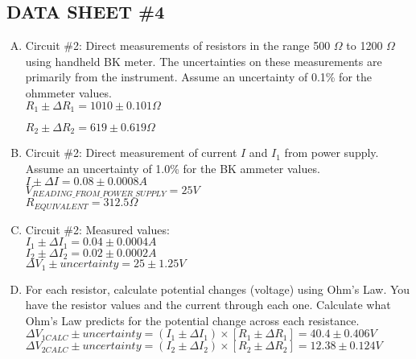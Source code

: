 \subsection{DATA SHEET \#4}
	\begin{enumerate}[A.]
		\item Circuit \#2: Direct measurements of resistors in the range 500 $\Omega$ to 1200 $\Omega$ using handheld BK meter.  The uncertainties on these measurements are primarily from the instrument.  Assume an uncertainty of 0.1\% for the ohmmeter values. \\
		
			$R_1 \pm \Delta R_1 = 1010 \pm 0.101 \Omega $
			
			$R_2 \pm \Delta R_2 = 619 \pm 0.619 \Omega $
			
		\item Circuit \#2: Direct measurement of current $I$ and $I_1$ from power supply.  Assume an uncertainty of 1.0\% for the BK ammeter values.\\
		
			$I \pm \Delta I = 0.08 \pm 0.0008 A$ \\
			
			$V_{READING\_FROM\_POWER\_SUPPLY} = 25 V$ \\
			
			$R_{EQUIVALENT} = 312.5 \Omega$ \\
			
		\item Circuit \#2: Measured values: \\
			
			$I_1 \pm \Delta I_1 = 0.04 \pm 0.0004 A$ \\ 
			
			$I_2 \pm \Delta I_2 = 0.02 \pm 0.0002 A$ \\
			
			$\Delta V_1 \pm uncertainty = 25 \pm 1.25 V$\\
			
		\item For each resistor, calculate potential changes (voltage) using Ohm's Law.  You have the resistor values and the current through each one.  Calculate what Ohm's Law predicts for the potential change across each resistance. \\
		
			$\Delta V_{1CALC} \pm uncertainty = (I_1 \pm \Delta I_1) \times [R_1 \pm \Delta R_1] =  40.4 \pm 0.406 V$\\ 
			
			$\Delta V_{2CALC} \pm uncertainty = (I_2 \pm \Delta I_2) \times [R_2 \pm \Delta R_2] =  12.38 \pm 0.124 V$\\ 
\end{enumerate}			